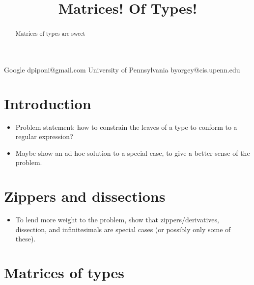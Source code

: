 \documentclass[authoryear,preprint]{sigplanconf}
\begin{document}


\title{Matrices! Of Types!}

           {Google}
           {dpiponi@gmail.com}
           {University of Pennsylvania}
           {byorgey@cis.upenn.edu}

\maketitle

\begin{abstract}
Matrices of types are sweet
\end{abstract}




\section{Introduction}

\begin{itemize}
\item Problem statement: how to constrain the leaves of a type to
  conform to a regular expression?
\item Maybe show an ad-hoc solution to a special case, to give a
  better sense of the problem.
\end{itemize}

\section{Zippers and dissections}
\label{sec:zippers-and-dissections}


\begin{itemize}
\item To lend more weight to the problem, show that
  zippers/derivatives, dissection, and infinitesimals are special
  cases (or possibly only some of these).
\end{itemize}

\section{Matrices of types}
\label{sec:matrices-of-types}
\end{document}
